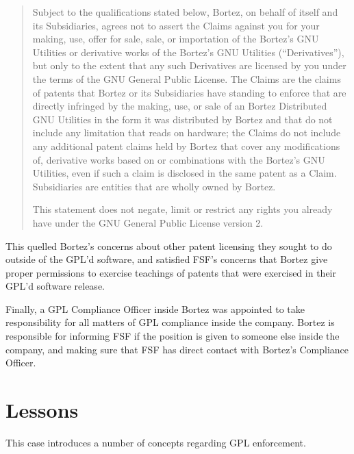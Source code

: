 \begin{quotation}
Subject to the qualifications stated below, Bortez, on behalf of itself
and its Subsidiaries, agrees not to assert the Claims against you for your
making, use, offer for sale, sale, or importation of the Bortez's GNU
Utilities or derivative works of the Bortez's GNU Utilities
(``Derivatives''), but only to the extent that any such Derivatives are
licensed by you under the terms of the GNU General Public License. The
Claims are the claims of patents that Bortez or its Subsidiaries have
standing to enforce that are directly infringed by the making, use, or
sale of an Bortez Distributed GNU Utilities in the form it was distributed
by Bortez and that do not include any limitation that reads on hardware;
the Claims do not include any additional patent claims held by Bortez that
cover any modifications of, derivative works based on or combinations with
the Bortez's GNU Utilities, even if such a claim is disclosed in the same
patent as a Claim. Subsidiaries are entities that are wholly owned by
Bortez.

This statement does not negate, limit or restrict any rights you already
have under the GNU General Public License version 2.
\end{quotation}

This quelled Bortez's concerns about other patent licensing they sought to
do outside of the GPL'd software, and satisfied FSF's concerns that Bortez
give proper permissions to exercise teachings of patents that were
exercised in their GPL'd software release.

Finally, a GPL Compliance Officer inside Bortez was appointed to take
responsibility for all matters of GPL compliance inside the company.
Bortez is responsible for informing FSF if the position is given to
someone else inside the company, and making sure that FSF has direct
contact with Bortez's Compliance Officer.

\section{Lessons}

This case introduces a number of concepts regarding GPL enforcement.

